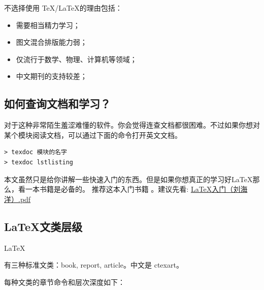 \documentclass[UTF8,AutoFakeBold]{ctexart}
\numberwithin{figure}{section}
\numberwithin{table}{section}
\begin{document}
\Checkmark 不选择使用 \TeX/\LaTeX 的理由包括：
\begin{itemize}
    \item 需要相当精力学习；
    \item 图文混合排版能力弱；
    \item 仅流行于数学、物理、计算机等领域；
    \item 中文期刊的支持较差；
\end{itemize}

\subsection{如何查询文档和学习？}
对于这种非常陌生羞涩难懂的软件。你会觉得连查文档都很困难。不过如果你想对某个模块阅读文档，可以通过下面的命令打开英文文档。

\begin{lstlisting}
> texdoc 模块的名字
> texdoc lstlisting
\end{lstlisting}

本文虽然只是给你讲解一些快速入门的东西。但是如果你想真正的学习好\LaTeX 那么，看一本书籍是必备的。
推荐这本入门书籍\cite{latex_start} 。建议先看: \href{https://github.com/heartacker/MyNotes/blob/master/01.Latex/LaTeX_Docs_2014/04%20%E7%94%B5%E5%AD%90%E4%B9%A6/LaTeX%E5%85%A5%E9%97%A8%EF%BC%88%E5%88%98%E6%B5%B7%E6%B4%8B%EF%BC%89.pdf}{LaTeX入门（刘海洋）.pdf}


\subsection{\LaTeX 文类层级}
\label{sec:structure}
\hypertarget{Levelofdepth}{\LaTeX} 有三种标准文类：book, report, article。中文是 ctexart。

每种文类的章节命令和层次深度如下：
\end{document}
